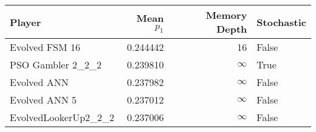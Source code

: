 \begin{tabular}{lrrl}
\toprule
               Player &  Mean $p_1$ &  Memory Depth & Stochastic \\
\midrule
       Evolved FSM 16 &    0.244442 &            16 &      False \\
    PSO Gambler 2\_2\_2 &    0.239810 &            \(\infty\) &       True \\
          Evolved ANN &    0.237982 &            \(\infty\) &      False \\
        Evolved ANN 5 &    0.237012 &            \(\infty\) &      False \\
 EvolvedLookerUp2\_2\_2 &    0.237006 &            \(\infty\) &      False \\
\bottomrule
\end{tabular}
